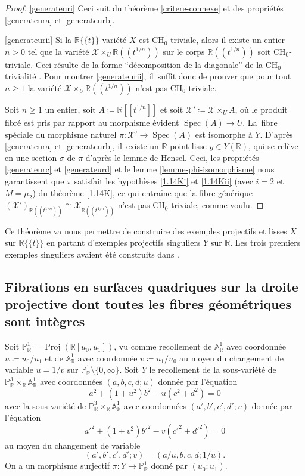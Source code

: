 \documentclass[11pt]{article}
\newcommand{\skpt}{\smallskip}
\providecommand{\skippointrait}{\smallskip}
\let\skpt\skippointrait
\newcommand{\CH}{\mathrm{CH}}
\theoremstyle{definition}
\newcommand{\R}{\mathbb R}
\newcommand{\A}{\mathbb A}
\renewcommand{\P}{\mathbb P}
\newcommand{\Spec}{\operatorname{Spec}}
\newcommand{\mc}[1]{\mathcal{#1}}
\newcommand{\on}[1]{\operatorname{#1}}
\newcommand{\puiseux}{\mathbb{R}\{\!\{t\}\!\}}
\begin{document}
\skpt
\begin{proof}
\eqref{generateuri}
Ceci suit du théorème \ref{critere-connexe} et des propriétés \eqref{generateura} et \eqref{generateurb}.

\eqref{generateurii}
Si la $\puiseux$-variété $X$ est $\CH_0$-triviale,
alors il existe un entier $n>0$ tel que la variété
$\mc{X}\times_U \R(\!(t^{1/n})\!)$ sur le corps $\R(\!(t^{1/n})\!)$
soit $\CH_0$-triviale. Ceci résulte de la forme ``décomposition de la diagonale''
de la $\CH_0$-trivialité \cite[Prop.\,1.4]{colliot2016hypersurfaces}. Pour montrer \eqref{generateurii}, il~suffit donc de prouver que pour tout $n\geq 1$ la variété
$\mc{X}\times_U \R(\!(t^{1/n})\!)$ n'est pas $\CH_0$-triviale.

Soit $n\geq 1$ un entier, soit $A\coloneqq \R[\![t^{1/n}]\!]$ et soit $\mc{X}'\coloneqq \mc{X}\times_U A$, où le produit fibré est pris par rapport au morphisme évident $\Spec(A)\to U$. La~fibre spéciale du morphisme naturel $\pi\colon \mc{X}'\to \Spec(A)$ est isomorphe à $Y$. D'après \eqref{generateura} et \eqref{generateurb}, il~existe un $\R$-point lisse $y\in Y(\R)$, qui se relève en une section $\sigma$ de $\pi$ d'après le lemme de Hensel. Ceci, les propriétés \eqref{generateurc} et \eqref{generateurd} et le lemme \ref{lemme-phi-isomorphisme} nous garantissent que $\pi$ satisfait les hypothèses \eqref{1.14Ki} et \eqref{1.14Kii} (avec $i=2$ et $M=\mu_2$) du théorème \ref{1.14K}, ce qui entraîne que la fibre générique $(\mc{X}')_{\R(\!(t^{1/n})\!)}\cong\mc{X}_{\R(\!(t^{1/n})\!)}$ n'est pas $\CH_0$-triviale, comme voulu.
\end{proof}

Ce théorème va nous permettre de construire des exemples projectifs et lisses $X$ sur $\puiseux$ en partant d'exemples projectifs singuliers $Y$ sur $\R$. Les trois premiers exemples singuliers avaient été construits dans \cite{colliot2024certaines}.

\subsection{Fibrations en surfaces quadriques sur la droite projective dont toutes les fibres géométriques sont intègres}\label{contreexemple}

Soit $\P^1_\R=\on{Proj}(\R[u_0,u_1])$, vu comme recollement de $\A^1_\R$ avec coordonnée $u\coloneqq u_0/u_1$ et de $\A^1_\R$ avec coordonnée $v\coloneqq u_1/u_0$ au moyen du changement de variable $u=1/v$ sur $\P^1_\R\setminus\{0,\infty\}$. Soit $Y$ le recollement de la sous-variété de $\P^3_{\R} \times_{\R} \A^1_{\R}$ avec coordonnées $(a,b,c,d;u)$ donnée par l'équation
\[a^2+(1+u^2) b^2 - u (c^2+d^2)=0\]
avec la sous-variété de $\P^3_{\R} \times_{\R} \A^1_{\R}$ avec coordonnées $(a',b',c',d'; v)$ donnée par l'équation
\[a'^2+(1+v^2)b'^2-v(c'^2+d'^2)=0\]
au moyen du changement de variable
\[(a',b',c',d';v)=(a/u, b, c, d; 1/u).\] On a un morphisme surjectif $\pi\colon Y \to \P^1_\R$ donné par $(u_0:u_1)$.
\end{document}
